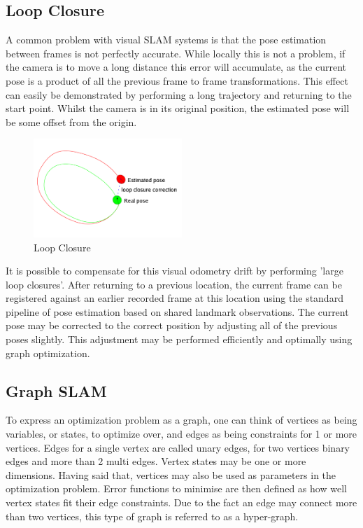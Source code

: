 \subsection{Loop Closure}
\label{subsec:loop_closure}

A common problem with visual SLAM systems is that the pose estimation between frames is not perfectly accurate.  While locally this is not a problem, if the camera is to move a long distance this error will accumulate, as the current pose is a product of all the previous frame to frame transformations.  This effect can easily be demonstrated by performing a long trajectory and returning to the start point.  Whilst the camera is in its original position, the estimated pose will be some offset from the origin.

\begin{figure}[h!]
  \centering
    \includegraphics[width=0.5\textwidth]{chapters/images/loop-closure}
  \caption{Loop Closure}
\end{figure}

It is possible to compensate for this visual odometry drift by performing 'large loop closures'. After returning to a previous location, the current frame can be registered against an earlier recorded frame at this location using the standard pipeline of pose estimation based on shared landmark observations.  The current pose may be corrected to the correct position by adjusting all of the previous poses slightly.  This adjustment may be performed efficiently and optimally using graph optimization.

\subsection{Graph SLAM}
\label{subsec:graph_slam}

To express an optimization problem as a graph, one can think of vertices as being variables, or states, to optimize over, and edges as being constraints for 1 or more vertices.  Edges for a single vertex are called unary edges, for two vertices binary edges and more than 2 multi edges.  Vertex states may be one or more dimensions.  Having said that, vertices may also be used as parameters in the optimization problem.  Error functions to minimise are then defined as how well vertex states fit their edge constraints.  Due to the fact an edge may connect more than two vertices, this type of graph is referred to as a hyper-graph.

